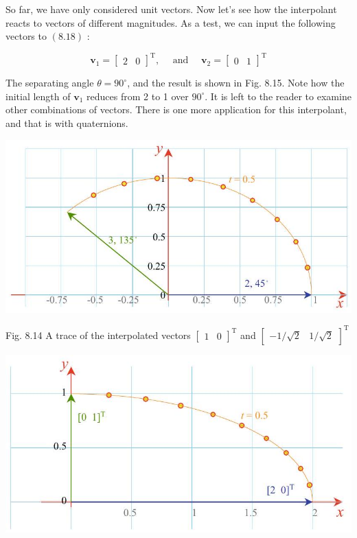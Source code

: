 \documentclass[10pt]{article}
\begin{document}
So far, we have only considered unit vectors. Now let's see how the interpolant reacts to vectors of different magnitudes. As a test, we can input the following vectors to $(8.18)$ :

$$
\mathbf{v}_{1}=\left[\begin{array}{ll}
2 & 0
\end{array}\right]^{\mathrm{T}}, \quad \text { and } \quad \mathbf{v}_{2}=\left[\begin{array}{ll}
0 & 1
\end{array}\right]^{\mathrm{T}}
$$

The separating angle $\theta=90^{\circ}$, and the result is shown in Fig. 8.15. Note how the initial length of $\mathbf{v}_{1}$ reduces from 2 to 1 over $90^{\circ}$. It is left to the reader to examine other combinations of vectors. There is one more application for this interpolant, and that is with quaternions.

\begin{center}
\includegraphics[max width=\textwidth]{2023_04_20_41f1ceac5a31dc7d1b59g-167(1)}
\end{center}

Fig. 8.14 A trace of the interpolated vectors $\left[\begin{array}{ll}1 & 0\end{array}\right]^{\mathrm{T}}$ and $\left[\begin{array}{ll}-1 / \sqrt{2} & 1 / \sqrt{2}\end{array}\right]^{\mathrm{T}}$

\begin{center}
\includegraphics[max width=\textwidth]{2023_04_20_41f1ceac5a31dc7d1b59g-167}
\end{center}
\end{document}
